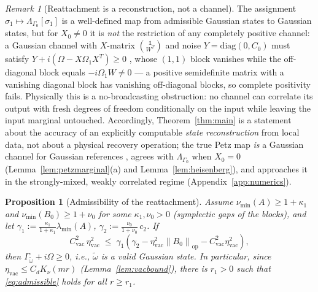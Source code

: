 \documentclass[11pt,a4paper]{article}
\newcommand{\idm}{\mathds{1}}}{\newcommand{\idm}{\mathbf{1}}}
\theoremstyle{plain}
\newtheorem{proposition}[theorem]{Proposition}
\theoremstyle{definition}
\theoremstyle{remark}
\newtheorem{remark}[theorem]{Remark}
\newcommand{\opnorm}[1]{\left\lVert #1 \right\rVert_{\mathrm{op}}}
\newcommand{\etavac}{\eta_{\mathrm{vac}}}
\newcommand{\Cvac}{C_{\mathrm{vac}}}
\begin{document}
\begin{remark}[Reattachment is a reconstruction, not a channel]\label{rem:notchannel}
The assignment $\sigma_1 \mapsto \Lambda_{\Gamma_0}[\sigma_1]$ is a well-defined
map from admissible Gaussian states to Gaussian states, but for $X_0 \neq 0$ it is
\emph{not} the restriction of any completely positive channel: a Gaussian channel
with $X$-matrix $\binom{\idm}{W^T}$ and noise $Y = \mathrm{diag}(0, C_0)$ must
satisfy $Y + i(\Omega - X\Omega_1 X^T) \ge 0$ \cite[Chapter~12]{Holevo11}, whose
$(1,1)$ block vanishes while the off-diagonal block equals $-i\Omega_1 W \ne 0$
--- a positive semidefinite matrix with a vanishing diagonal block has vanishing
off-diagonal blocks, so complete positivity fails. Physically this is a
no-broadcasting obstruction: no channel can correlate its output with fresh
degrees of freedom conditionally on the input while leaving the input marginal
untouched. Accordingly, Theorem~\ref{thm:main} is a statement about the accuracy
of an explicitly computable \emph{state reconstruction} from local data, not
about a physical recovery operation; the true Petz map \emph{is} a Gaussian
channel for Gaussian references \cite{LamiDasWilde18}, agrees with
$\Lambda_{\Gamma_0}$ when $X_0 = 0$ (Lemma~\ref{lem:petzmarginal}(a) and
Lemma~\ref{lem:heisenberg}), and approaches it in the strongly-mixed, weakly
correlated regime (Appendix~\ref{app:numerics}).
\end{remark}

\begin{proposition}[Admissibility of the reattachment]\label{prop:admissible}
Assume $\nu_{\min}(A) \ge 1 + \kappa_1$ and $\nu_{\min}(B_0) \ge 1 + \nu_0$ for
some $\kappa_1, \nu_0 > 0$ (symplectic gaps of the blocks), and let
$\gamma_1 := \tfrac{\kappa_1}{1+\kappa_1}\lambda_{\min}(A)$,
$\gamma_2 := \tfrac{\nu_0}{1+\nu_0}\, c_2$. If
\begin{equation}\label{eq:admissible}
\Cvac^2\,\etavac^2 \;\le\; \gamma_1\left(\gamma_2 - \etavac^2\opnorm{B_0}
- \Cvac^2\etavac^2\right),
\end{equation}
then $\Gamma_{\tilde{\omega}} + i\Omega \ge 0$, i.e., $\tilde{\omega}$ is a valid
Gaussian state. In particular, since $\etavac \le C_d K_\nu(mr)$
(Lemma~\ref{lem:vacbound}), there is $r_1 > 0$ such that \eqref{eq:admissible}
holds for all $r \ge r_1$.
\end{proposition}
\end{document}

